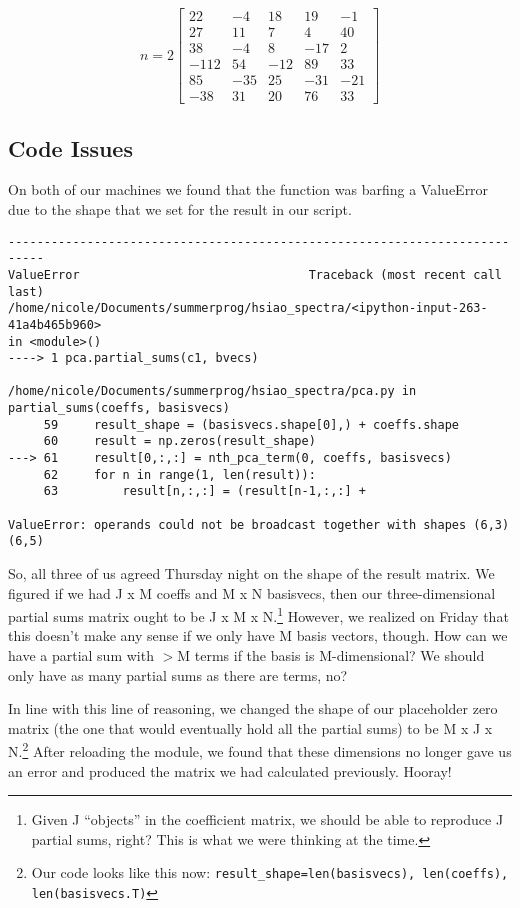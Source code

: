\documentclass{article}
\begin{document}
\[n=2 \left[ \begin{array}{ccccc}
22 & -4 & 18 & 19 & -1 \\
27 & 11 & 7 & 4 & 40 \\
38 & -4 & 8 & -17 & 2 \\
-112 & 54 & -12 & 89 & 33 \\
85 & -35 & 25 & -31 & -21 \\
-38 & 31 & 20 & 76 & 33
\end{array} \right] \]

\subsection{Code Issues}
\label{sec:coding}

On both of our machines we found that the function was barfing a
ValueError due to the shape that we set for the result in our script.

\begin{verbatim}
---------------------------------------------------------------------------
ValueError                                Traceback (most recent call
last)
/home/nicole/Documents/summerprog/hsiao_spectra/<ipython-input-263-41a4b465b960>
in <module>()
----> 1 pca.partial_sums(c1, bvecs)

/home/nicole/Documents/summerprog/hsiao_spectra/pca.py in
partial_sums(coeffs, basisvecs)
     59     result_shape = (basisvecs.shape[0],) + coeffs.shape
     60     result = np.zeros(result_shape)
---> 61     result[0,:,:] = nth_pca_term(0, coeffs, basisvecs)
     62     for n in range(1, len(result)):
     63         result[n,:,:] = (result[n-1,:,:] +

ValueError: operands could not be broadcast together with shapes (6,3)
(6,5) 
\end{verbatim}

So, all three of us agreed Thursday night on the shape of the result matrix.  We
figured if we had J x M coeffs and M x N basisvecs, then our
three-dimensional partial sums matrix ought to be J x M x
N.\footnote{Given J ``objects'' in the coefficient matrix, we should
  be able to reproduce J partial sums, right?  This is what we were
  thinking at the time.}  However,
we realized on Friday that this doesn't make any sense if we only have
M basis vectors, though.  How can we have a partial sum with $>$M terms
if the basis is M-dimensional?  We should only have as many partial
sums as there are terms, no?

In line with this line of reasoning, we changed the shape of our
placeholder zero matrix (the one that would eventually hold all the
partial sums) to be M x J x N.\footnote{Our code looks like this
  now: \texttt{result\_shape=len(basisvecs), len(coeffs),
    len(basisvecs.T)}} After reloading the module, we found that these
dimensions no longer gave us an error and produced the matrix we had
calculated previously.  Hooray!
\end{document}
